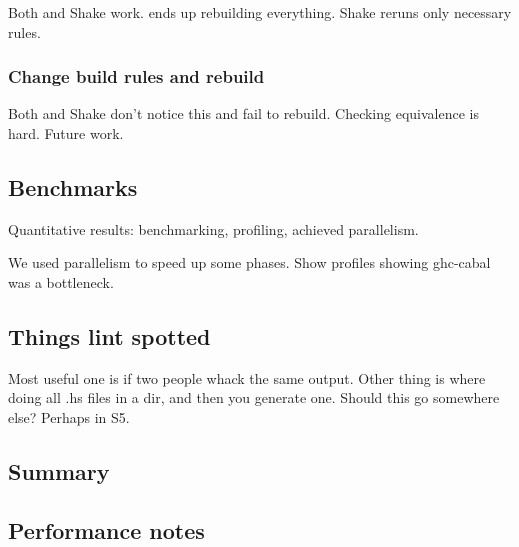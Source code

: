 Both \make{} and Shake work. \make{} ends up rebuilding everything. Shake reruns
only necessary rules.

\subsubsection{Change build rules and rebuild}

Both \make{} and Shake don't notice this and fail to rebuild. Checking
equivalence is hard. Future work.

\subsection{Benchmarks\label{sec:benchmarks}}


Quantitative results: benchmarking, profiling, achieved parallelism.

We used parallelism to speed up some phases. Show profiles showing ghc-cabal was
a bottleneck.

\subsection{Things lint spotted}


Most useful one is if two people whack the same output. Other thing is where
doing all .hs files in a dir, and then you generate one. Should this go
somewhere else? Perhaps in S5.

\subsection{Summary}





\subsection{Performance notes}

